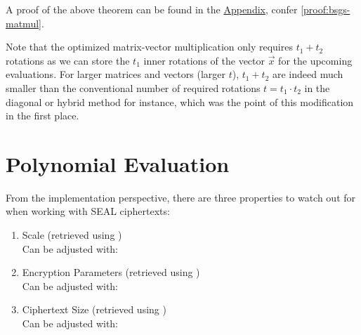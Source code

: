A proof of the above theorem can be found in the \hyperref[chap:appendix]{Appendix}, confer \autoref{proof:bsgs-matmul}.

Note that the optimized matrix-vector multiplication only requires $t_1 + t_2$ rotations as we can store the $t_1$ inner rotations of the vector $\vec{x}$ for the upcoming evaluations.
For larger matrices and vectors (larger $t$), $t_1 + t_2$ are indeed much smaller than the conventional number of required rotations $t = t_1 \cdot t_2$ in the diagonal or hybrid method for instance, which was the point of this modification in the first place.

\section{Polynomial Evaluation}
From the implementation perspective, there are three properties to watch out for when working with SEAL ciphertexts:

\begin{enumerate}
  \item Scale (retrieved using ) \\
        Can be adjusted with: 
  \item Encryption Parameters (retrieved using ) \\
        Can be adjusted with: 
  \item Ciphertext Size (retrieved using ) \\
        Can be adjusted with: 
\end{enumerate}

